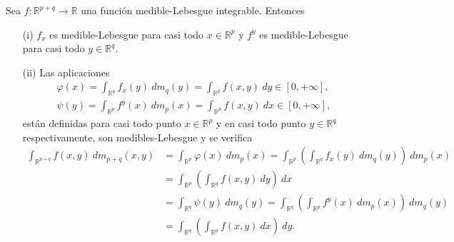 \begin{teo}
    Sea $f: \mathbb{R}^{p+q} \longrightarrow \mathbb{R}$ una función medible-Lebesgue integrable. Entonces
    \begin{enumerate}
        \item[(i)] $f_x$ es medible-Lebesgue para casi todo $x \in \mathbb{R}^p$ y $f^y$ es medible-Lebesgue para casi todo $y \in \mathbb{R}^q$.
        \item[(ii)] Las aplicaciones
              \begin{align*}
                  \varphi(x) = \int_{\mathbb{R}^q}{f_x(y) \ dm_q(y)} = \int_{\mathbb{R}^q}{f(x,y) \ dy} \in [0,+\infty], \\
                  \psi(y) = \int_{\mathbb{R}^p}{f^y(x) \ dm_p(x)} = \int_{\mathbb{R}^p}{f(x,y) \ dx} \in [0,+\infty],
              \end{align*}
              están definidas para casi todo punto $x \in \mathbb{R}^{p}$ y en casi todo punto $y \in \mathbb{R}^{q}$ respectivamente, son medibles-Lebesgue y se verifica
              \begin{align*}
                  \int_{\mathbb{R}^{p+q}}{f(x,y) \ dm_{p+q}(x,y)} & = \int_{\mathbb{R}^p}{\varphi(x) \ dm_p(x)} = \int_{\mathbb{R}^p}\left( \int_{\mathbb{R}^q}{f_x(y) \ dm_q(y)} \right) \ dm_p(x) \\
                                                                  & = \int_{\mathbb{R}^p}\left( \int_{\mathbb{R}^q}{f(x,y) \ dy} \right) \ dx                                                       \\
                                                                  & = \int_{\mathbb{R}^q}{\psi(y) \ dm_q(y)} = \int_{\mathbb{R}^q}\left( \int_{\mathbb{R}^p}{f^y(x) \ dm_p(x)} \right) \ dm_q(y)    \\
                                                                  & = \int_{\mathbb{R}^q}\left( \int_{\mathbb{R}^p}{f(x,y) \ dx} \right) \ dy.
              \end{align*}
    \end{enumerate}
\end{teo}